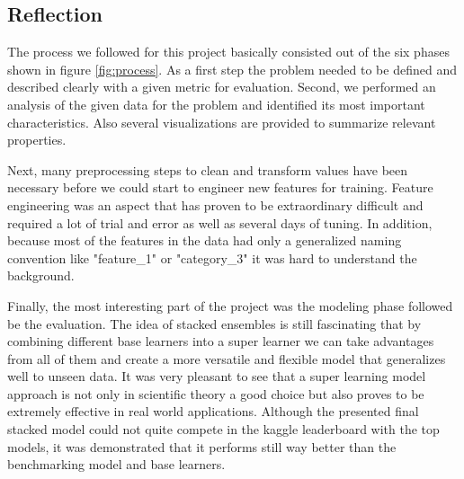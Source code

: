 \documentclass{article}
\begin{document}
\subsection{Reflection}


The process we followed for this project basically consisted out of the six phases shown in figure \ref{fig:process}. As a first step the problem needed to be defined and described clearly with a given metric for evaluation. Second, we performed an analysis of the given data for the problem and identified its most important characteristics. Also several visualizations are provided to summarize relevant properties. 

Next, many preprocessing steps to clean and transform values have been necessary before we could start to engineer new features for training. Feature engineering was an aspect that has proven to be extraordinary difficult and required a lot of trial and error as well as several days of tuning. In addition, because most of the features in the data had only a generalized naming convention like "feature\_1" or "category\_3" it was hard to understand the background.

Finally, the most interesting part of the project was the modeling phase followed be the evaluation. The idea of stacked ensembles is still fascinating that by combining different base learners into a super learner we can take advantages from all of them and create a more versatile and flexible model that generalizes well to unseen data. It was very pleasant to see that a super learning model approach is not only in scientific theory a good choice but also proves to be extremely effective in real world applications. Although the presented final stacked model could not quite compete in the kaggle leaderboard with the top models, it was demonstrated that it performs still way better than the benchmarking model and base learners.
\end{document}
